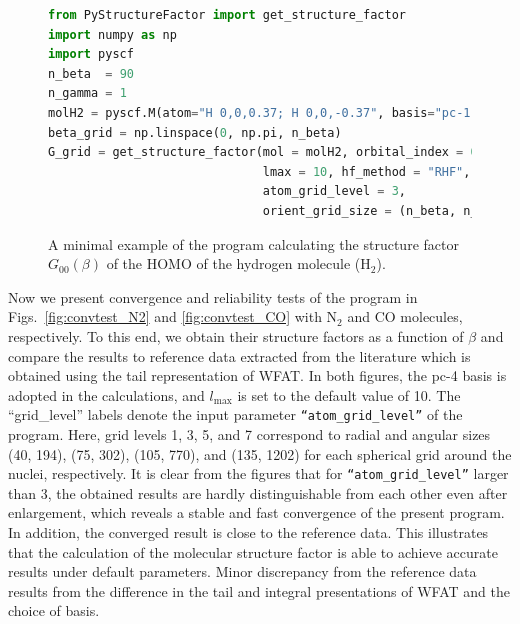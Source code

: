\documentclass[preprint,12pt]{elsarticle} %
\renewcommand{\rm}[1]{\mathrm{#1}}    %
\begin{document}
\begin{figure}[tb]
    \begin{lstlisting}[language=Python, basicstyle=\footnotesize\ttfamily, breaklines=true, keywordstyle=\color{blue}, stringstyle=\color{purple}, commentstyle=\color{gray}, frame=tb, framesep=1em]
from PyStructureFactor import get_structure_factor
import numpy as np
import pyscf
n_beta  = 90
n_gamma = 1
molH2 = pyscf.M(atom="H 0,0,0.37; H 0,0,-0.37", basis="pc-1", spin=0)
beta_grid = np.linspace(0, np.pi, n_beta)
G_grid = get_structure_factor(mol = molH2, orbital_index = 0, channel = (0,0),
                              lmax = 10, hf_method = "RHF",
                              atom_grid_level = 3,
                              orient_grid_size = (n_beta, n_gamma))
    \end{lstlisting}
    \caption{A minimal example of the program calculating the structure factor $G_{00}(\beta)$ of the HOMO of the hydrogen molecule ($\rm{H}_2$).}
    \label{fig:code_example}
\end{figure}

Now we present convergence and reliability tests of the program in Figs.~\ref{fig:convtest_N2} and \ref{fig:convtest_CO} with N$_2$ and CO molecules, respectively. To this end, we obtain their structure factors as a function of $\beta$ and compare the results to reference data extracted from the literature \cite{saito_structure_2015} which is obtained using the tail representation of WFAT. In both figures, the pc-4 basis is adopted in the calculations, and $l_{\rm{max}}$ is set to the default value of 10. The ``grid\_level'' labels denote the input parameter \texttt{``atom\_grid\_level''} of the program. Here, grid levels 1, 3, 5, and 7 correspond to radial and angular sizes (40, 194), (75, 302), (105, 770), and (135, 1202) for each spherical grid around the nuclei, respectively. It is clear from the figures that for \texttt{``atom\_grid\_level''} larger than 3, the obtained results are hardly distinguishable from each other even after enlargement, which reveals a stable and fast convergence of the present program. In addition, the converged result is close to the reference data. This illustrates that the calculation of the molecular structure factor is able to achieve accurate results under default parameters. Minor discrepancy from the reference data results from the difference in the tail and integral presentations of WFAT and the choice of basis. %
\end{document}
